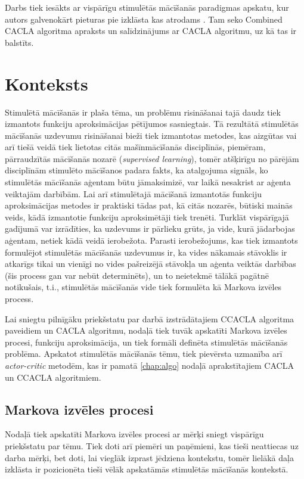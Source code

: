 \documentclass{ludis} %
\begin{document}
Darbs tiek iesākts ar vispārīgu stimulētās mācīšanās paradigmas apskatu, kur
autors galvenokārt pieturas pie izklāsta kas atrodams \autocite{Krislauks2015}.
Tam seko Combined CACLA algoritma apraksts un salīdzinājums ar CACLA algoritmu, uz
kā tas ir balstīts.


\chapter{Konteksts}
Stimulētā mācīšanās ir plaša tēma, un problēmu risināšanai tajā daudz tiek
izmantots funkciju aproksimācijas pētījumos sasniegtais. Tā rezultātā stimulētās
mācīšanās uzdevumu risināšanai bieži tiek izmantotas metodes, kas aizgūtas vai
arī tiešā veidā tiek lietotas citās mašīnmācīšanās disciplīnās, piemēram,
pārraudzītās mācīšanās nozarē (\textit{supervised learning}), tomēr atšķirīgu
no pārējām disciplīnām stimulēto mācīšanos padara fakts, ka atalgojuma signāls,
ko stimulētās mācīšanās aģentam būtu jāmaksimizē, var laikā nesakrist ar aģenta
veiktajām darbībām. Lai arī stimulētajā mācīšanā izmantotās funkciju
aproksimācijas metodes ir praktiski tādas pat, kā citās nozarēs, būtiski mainās
veids, kādā izmantotie funkciju aproksimētāji tiek trenēti. Turklāt vispārīgajā
gadījumā var izrādīties, ka uzdevums ir pārlieku grūts, ja vide, kurā jādarbojas
aģentam, netiek kādā veidā ierobežota. Parasti ierobežojums, kas tiek izmantots
formulējot stimulētās mācīšanās uzdevumus ir, ka vides nākamais stāvoklis ir
atkarīgs tikai un vienīgi no vides pašreizējā stāvokļa un aģenta veiktās
darbības (šis process gan var nebūt determinēts), un to neietekmē tālākā
pagātnē notikušais, t.i., stimulētās mācīšanās vide tiek formulēta kā Markova
izvēles process.

Lai sniegtu pilnīgāku priekšstatu par darbā izstrādātajiem CCACLA algoritma
paveidiem un CACLA algoritmu, nodaļā tiek tuvāk apskatīti Markova izvēles
procesi, funkciju aproksimācija, un tiek formāli definēta stimulētās mācīšanās
problēma. Apskatot stimulētās mācīšanās tēmu, tiek pievērsta uzmanība arī
\textit{actor-critic} metodēm, kas ir pamatā \ref{chap:algo} nodaļā
aprakstītajiem CACLA un CCACLA algoritmiem.

\section{Markova izvēles procesi} \label{sec:mdp}
Nodaļā tiek apskatīti Markova izvēles procesi ar mērķi sniegt vispārīgu
priekšstatu par tēmu. Tiek doti arī piemēri un paņēmieni, kas tieši neattiecas
uz darba mērķi, bet doti, lai vieglāk izprast jēdziena kontekstu, tomēr lielākā
daļa izklāsta ir pozicionēta tieši vēlāk apskatāmās stimulētās mācīšanās
kontekstā.
\end{document}
